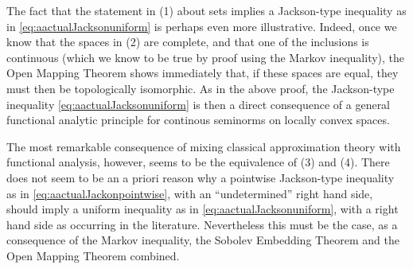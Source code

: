 \documentclass[12pt, reqno]{amsart}
\numberwithin{equation}{section}
\theoremstyle{plain}
\theoremstyle{definition}
\begin{document}
The fact that the statement in (1) about sets implies a Jackson-type inequality as in \eqref{eq:aactualJacksonuniform} is perhaps even more illustrative. Indeed, once we know that the spaces in (2) are complete, and that one of the inclusions is continuous (which we know to be true by proof using the Markov inequality), the Open Mapping Theorem shows immediately that, if these spaces are equal, they must then be topologically isomorphic. As in the above proof, the Jackson-type inequality \eqref{eq:aactualJacksonuniform} is then a direct consequence of a general functional analytic principle for continous seminorms on locally convex spaces.

The most remarkable consequence of mixing classical approximation theory with functional analysis, however, seems to be the equivalence of (3) and (4). There does not seem to be an a priori reason why a pointwise Jackson-type inequality as in \eqref{eq:aactualJackonpointwise}, with an ``undetermined'' right hand side, should imply a uniform inequality as in \eqref{eq:aactualJacksonuniform}, with a right hand side as occurring in the literature. Nevertheless this must be the case, as a consequence of the Markov inequality, the Sobolev Embedding Theorem and the Open Mapping Theorem combined.
\end{document}
